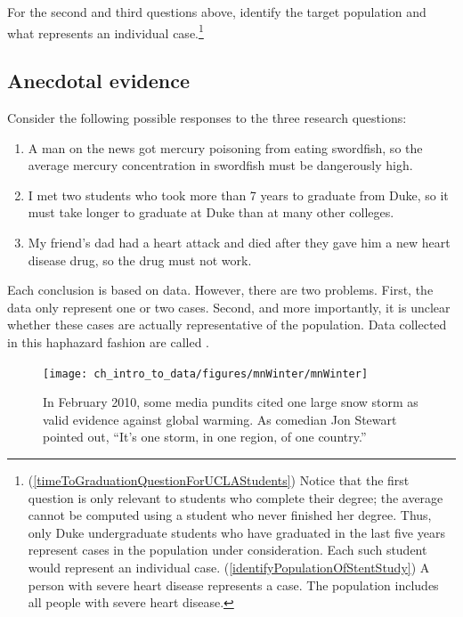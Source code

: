 \begin{exercise} \label{identifyingThePopulationForTwoQuestionsInPopAndSampSubsection}
For the second and third questions above, identify the target population and what represents an individual case.\footnote{(\ref{timeToGraduationQuestionForUCLAStudents}) Notice that the first question is only relevant to students who complete their degree; the average cannot be computed using a student who never finished her degree. Thus, only Duke undergraduate students who have graduated in the last five years represent cases in the population under consideration. Each such student would represent an individual case. (\ref{identifyPopulationOfStentStudy}) A person with severe heart disease represents a case. The population includes all people with severe heart disease.}
\end{exercise}


\subsection{Anecdotal evidence}
\label{anecdotalEvidenceSubsection}

Consider the following possible responses to the three research questions:
\begin{enumerate}
\item A man on the news got mercury poisoning from eating swordfish, so the average mercury concentration in swordfish must be dangerously high.
\item\label{iKnowThreeStudentsWhoTookMoreThan7YearsToGraduateAtDuke} I met two students who took more than 7 years to graduate from Duke, so it must take longer to graduate at Duke than at many other colleges.
\item\label{myFriendsDadDiedAfterSulphinpyrazon} My friend's dad had a heart attack and died after they gave him a new heart disease drug, so the drug must not work.
\end{enumerate}
Each conclusion is based on data. However, there are two problems. First, the data only represent one or two cases. Second, and more importantly, it is unclear whether these cases are actually representative of the population. Data collected in this haphazard fashion are called .

\setlength{\captionwidth}{\textwidth-80mm}
\begin{figure}
\centering
\hspace{8mm}\texttt{[image: ch\_intro\_to\_data/figures/mnWinter/mnWinter]}\hspace{4mm}
\begin{minipage}[b]{\textwidth - 80mm}
   \caption[anecdotal evidence]{In February 2010, some media pundits cited one large snow storm as valid evidence against global warming. As comedian Jon Stewart pointed out, ``It's one storm, in one region, of one country.''
   \label{mnWinter}}
\end{minipage}
\end{figure}
\setlength{\captionwidth}{\mycaptionwidth}

